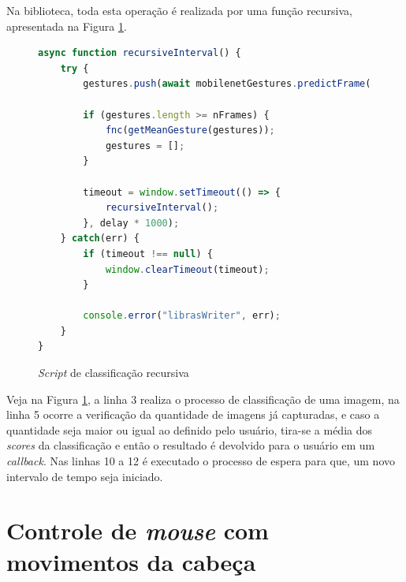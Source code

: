 \par Na biblioteca, toda esta operação é realizada por uma função recursiva, apresentada na Figura \ref{figure:funcao_recursiva_de_classificacao}.


\begin{figure}[H]
    \centering
    \begin{lstlisting}[language=JavaScript]
async function recursiveInterval() {
    try {
        gestures.push(await mobilenetGestures.predictFrame());

        if (gestures.length >= nFrames) {
            fnc(getMeanGesture(gestures));
            gestures = [];
        }

        timeout = window.setTimeout(() => {
            recursiveInterval();
        }, delay * 1000);       
    } catch(err) {
        if (timeout !== null) {
            window.clearTimeout(timeout);
        }

        console.error("librasWriter", err);
    }
}
    \end{lstlisting}
    \caption{\textit{Script} de classificação recursiva}
    \label{figure:funcao_recursiva_de_classificacao}
\end{figure}

\par Veja na Figura \ref{figure:funcao_recursiva_de_classificacao}, a linha 3 realiza o processo de classificação de uma imagem, na linha 5 ocorre a verificação da quantidade de imagens já capturadas, e caso a quantidade seja maior ou igual ao definido pelo usuário, tira-se a média dos \textit{scores} da classificação e então o resultado é devolvido para o usuário em um \textit{callback}. Nas linhas 10 a 12 é executado o processo de espera para que, um novo intervalo de tempo seja iniciado.

\section{Controle de \textit{mouse} com movimentos da cabeça}

